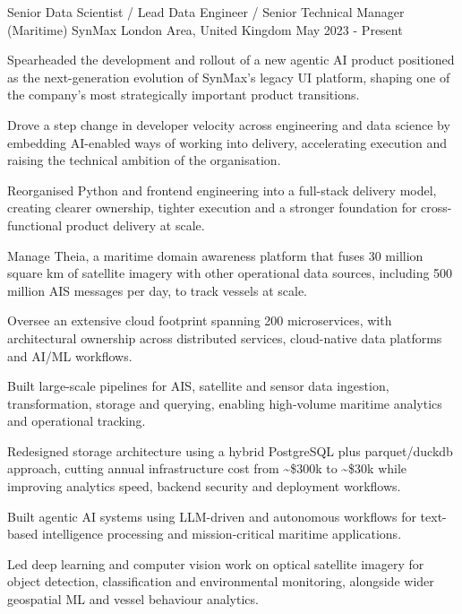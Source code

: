 \begin{cventries}
  \cventry
  {Senior Data Scientist / Lead Data Engineer / Senior Technical Manager (Maritime)}
  {SynMax}
  {London Area, United Kingdom}
  {May 2023 - Present}
  {
    \begin{cvitems}
      \item {Spearheaded the development and rollout of a new agentic AI product positioned as the next-generation evolution of SynMax's legacy UI platform, shaping one of the company's most strategically important product transitions.}
      \item {Drove a step change in developer velocity across engineering and data science by embedding AI-enabled ways of working into delivery, accelerating execution and raising the technical ambition of the organisation.}
      \item {Reorganised Python and frontend engineering into a full-stack delivery model, creating clearer ownership, tighter execution and a stronger foundation for cross-functional product delivery at scale.}
      \item {Manage Theia, a maritime domain awareness platform that fuses 30 million square km of satellite imagery with other operational data sources, including 500 million AIS messages per day, to track vessels at scale.}
      \item {Oversee an extensive cloud footprint spanning 200 microservices, with architectural ownership across distributed services, cloud-native data platforms and AI/ML workflows.}
      \item {Built large-scale pipelines for AIS, satellite and sensor data ingestion, transformation, storage and querying, enabling high-volume maritime analytics and operational tracking.}
      \item {Redesigned storage architecture using a hybrid PostgreSQL plus parquet/duckdb approach, cutting annual infrastructure cost from \textasciitilde\$300k to \textasciitilde\$30k while improving analytics speed, backend security and deployment workflows.}
      \item {Built agentic AI systems using LLM-driven and autonomous workflows for text-based intelligence processing and mission-critical maritime applications.}
      \item {Led deep learning and computer vision work on optical satellite imagery for object detection, classification and environmental monitoring, alongside wider geospatial ML and vessel behaviour analytics.}

\end{cvitems}}
\end{cventries}
